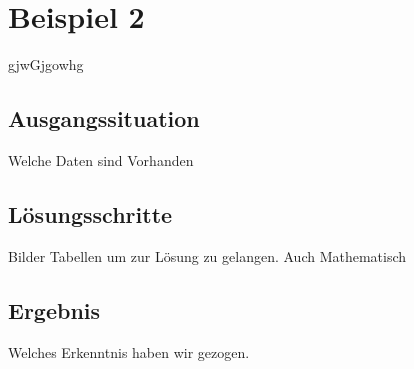 \section{Beispiel 2}
\label{sec:beispielzwei}
gjwGjgowhg

\subsection{Ausgangssituation} 
\label{sec:ausgangssituation2}
Welche Daten sind Vorhanden 


\subsection{Lösungsschritte} 
\label{sec:loesungen2}
Bilder Tabellen um zur Lösung zu gelangen. Auch Mathematisch

\subsection{Ergebnis} 
\label{sec:ergebnis2}
Welches Erkenntnis haben wir gezogen.
